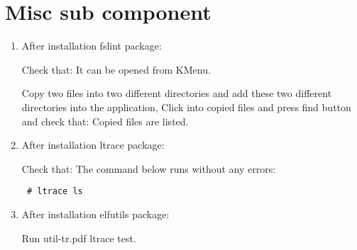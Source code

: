 \documentclass[a4paper,10pt]{article}
\begin{document}
\section{Misc sub component}
\begin{enumerate}
 \item After installation  fslint package:

Check that: It can be opened from KMenu.

Copy two files into two different directories and add these two different directories into the application, Click into copied files and press find button and check that: Copied files are listed.
 \item After installation  ltrace package:

Check that: The command below runs without any errors:
\begin{verbatim}
 # ltrace ls
\end{verbatim}
\item After installation  elfutils package:

Run util-tr.pdf ltrace test.
\end{enumerate}
\end{document}
